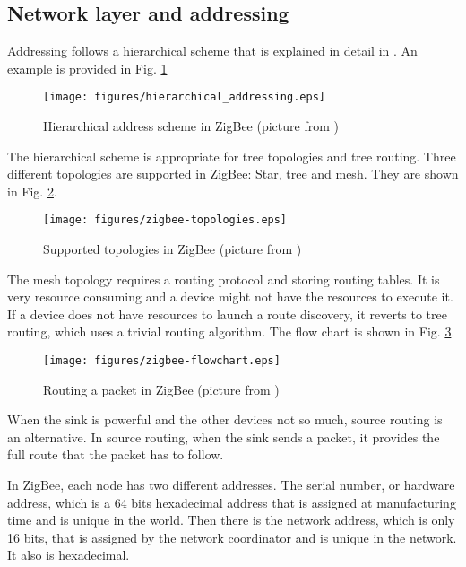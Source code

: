 \subsection{Network layer and addressing}

Addressing follows a hierarchical scheme that is explained in detail in \cite{baronti2007wsn}.
An example is provided in Fig. \ref{fig:hierarchical_addressing}

\begin{figure}[htbp]
  \centering
  \texttt{[image: figures/hierarchical\_addressing.eps]}
  \caption{Hierarchical address scheme in ZigBee (picture from \cite{baronti2007wsn})}
  \label{fig:hierarchical_addressing}
\end{figure}

The hierarchical scheme is appropriate for tree topologies and tree routing.
Three different topologies are supported in ZigBee: Star, tree and mesh.
They are shown in Fig. \ref{fig:zigbee-topologies}.

\begin{figure}[htbp]
  \centering
  \texttt{[image: figures/zigbee-topologies.eps]}
  \caption{Supported topologies in ZigBee (picture from \cite{baronti2007wsn})}
  \label{fig:zigbee-topologies}
\end{figure}

The mesh topology requires a routing protocol and storing routing tables. 
It is very resource consuming and a device might not have the resources to execute it.
If a device does not have resources to launch a route discovery, it reverts to tree routing, which uses a trivial routing algorithm.
The flow chart is shown in Fig. \ref{fig:zigbee-flowchart}.

\begin{figure}[htbp]
  \centering
  \texttt{[image: figures/zigbee-flowchart.eps]}
  \caption{Routing a packet in ZigBee (picture from \cite{baronti2007wsn})}
  \label{fig:zigbee-flowchart}
\end{figure}

When the sink is powerful and the other devices not so much, source routing is an alternative.
In source routing, when the sink sends a packet, it provides the full route that the packet has to follow.

In ZigBee, each node has two different addresses.
The serial number, or hardware address, which is a 64 bits hexadecimal address that is assigned at manufacturing time and is unique in the world.
Then there is the network address, which is only 16 bits, that is assigned by the network coordinator and is unique in the network. It also is hexadecimal.

